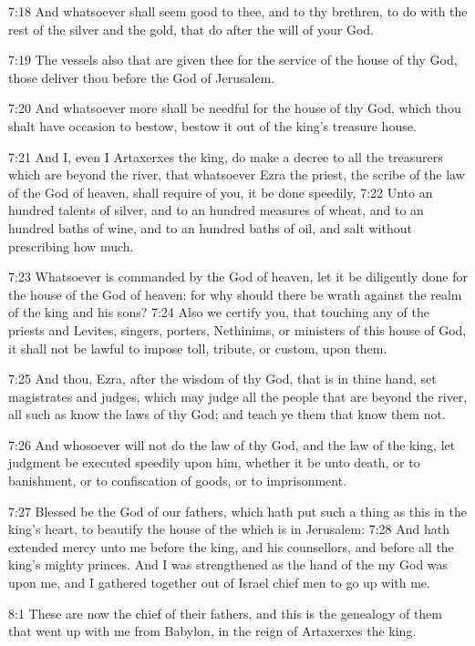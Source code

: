 7:18 And whatsoever shall seem good to thee, and to thy brethren, to
do with the rest of the silver and the gold, that do after the will of
your God.

7:19 The vessels also that are given thee for the service of the house
of thy God, those deliver thou before the God of Jerusalem.

7:20 And whatsoever more shall be needful for the house of thy God,
which thou shalt have occasion to bestow, bestow it out of the king's
treasure house.

7:21 And I, even I Artaxerxes the king, do make a decree to all the
treasurers which are beyond the river, that whatsoever Ezra the
priest, the scribe of the law of the God of heaven, shall require of
you, it be done speedily, 7:22 Unto an hundred talents of silver, and
to an hundred measures of wheat, and to an hundred baths of wine, and
to an hundred baths of oil, and salt without prescribing how much.

7:23 Whatsoever is commanded by the God of heaven, let it be
diligently done for the house of the God of heaven: for why should
there be wrath against the realm of the king and his sons?  7:24 Also
we certify you, that touching any of the priests and Levites, singers,
porters, Nethinims, or ministers of this house of God, it shall not be
lawful to impose toll, tribute, or custom, upon them.

7:25 And thou, Ezra, after the wisdom of thy God, that is in thine
hand, set magistrates and judges, which may judge all the people that
are beyond the river, all such as know the laws of thy God; and teach
ye them that know them not.

7:26 And whosoever will not do the law of thy God, and the law of the
king, let judgment be executed speedily upon him, whether it be unto
death, or to banishment, or to confiscation of goods, or to
imprisonment.

7:27 Blessed be the \LORD God of our fathers, which hath put such a
thing as this in the king's heart, to beautify the house of the \LORD
which is in Jerusalem: 7:28 And hath extended mercy unto me before the
king, and his counsellors, and before all the king's mighty princes.
And I was strengthened as the hand of the \LORD my God was upon me, and
I gathered together out of Israel chief men to go up with me.

8:1 These are now the chief of their fathers, and this is the
genealogy of them that went up with me from Babylon, in the reign of
Artaxerxes the king.

